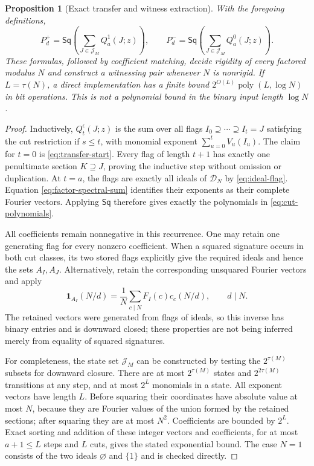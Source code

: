 \documentclass[11pt]{article}
\numberwithin{equation}{section}
\newtheorem{proposition}[theorem]{Proposition}
\theoremstyle{definition}
\theoremstyle{remark}
\begin{document}
\begin{proposition}[Exact transfer and witness extraction]
\label{prop:cut-transfer}
With the foregoing definitions,
\[
 P_d^+=\mathsf{Sq}\left(\sum_{J\in\mathcal J_M}Q_a^1(J;z)\right),
 \qquad
 P_d^-=\mathsf{Sq}\left(\sum_{J\in\mathcal J_M}Q_a^0(J;z)\right).
\]
These formulas, followed by coefficient matching, decide rigidity of every
factored modulus $N$ and construct a witnessing pair whenever $N$ is
nonrigid.  If $L=\tau(N)$, a direct implementation has a finite bound
$2^{O(L)}\operatorname{poly}(L,\log N)$ in bit operations.  This is not a
polynomial bound in the binary input length $\log N$.
\end{proposition}
\begin{proof}
Inductively, $Q_t^{\epsilon}(J;z)$ is the sum over all flags
$I_0\supseteq\cdots\supseteq I_t=J$ satisfying the cut restriction if
$s\le t$, with monomial exponent $\sum_{u=0}^t V_u(I_u)$.
The claim for $t=0$ is \eqref{eq:transfer-start}.  Every flag of length
$t+1$ has exactly one penultimate section $K\supseteq J$, proving the
inductive step without omission or duplication.  At $t=a$, the flags
are exactly all ideals of $\mathcal D_N$ by \eqref{eq:ideal-flag}.
Equation \eqref{eq:factor-spectral-sum} identifies their exponents as
their complete Fourier vectors.  Applying $\mathsf{Sq}$ therefore gives
exactly the polynomials in \eqref{eq:cut-polynomials}.

All coefficients remain nonnegative in this recurrence.  One may retain
one generating flag for every nonzero coefficient.  When a squared
signature occurs in both cut classes, its two stored flags explicitly
give the required ideals and hence the sets $A_I,A_J$.  Alternatively,
retain the corresponding unsquared Fourier vectors and apply
\[
 \mathbf1_{A_I}(N/d)=\frac1N\sum_{c\mid N}F_I(c)c_c(N/d),\qquad d\mid N.
\]
The retained vectors were generated from flags of ideals, so this inverse
has binary entries and is downward closed; these properties are not being
inferred merely from equality of squared signatures.

For completeness, the state set $\mathcal J_M$ can be constructed by
testing the $2^{\tau(M)}$ subsets for downward closure.  There are at most
$2^{\tau(M)}$ states and $2^{2\tau(M)}$ transitions at any step, and
at most $2^L$ monomials in a state.  All exponent vectors have length
$L$.  Before squaring their coordinates have absolute value at most $N$,
because they are Fourier values of the union formed by the retained
sections; after squaring they are at most $N^2$.  Coefficients are bounded
by $2^L$.  Exact sorting and addition of these integer vectors and
coefficients, for at most $a+1\le L$ steps and $L$ cuts, gives the stated
exponential bound.  The case $N=1$ consists of the two ideals
$\varnothing$ and $\{1\}$ and is checked directly.
\end{proof}
\end{document}
